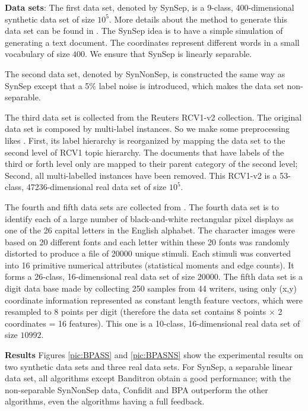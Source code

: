 \textbf{Data sets}:
The first data set, denoted by SynSep,  is a 9-class, 400-dimensional synthetic data set of size $10^5$. More details about the method to generate this data set can be found in \cite{kakade2008efficient}. The SynSep  idea is to have a simple simulation of generating a text document. The coordinates represent different words in a small vocabulary of size $400$. We ensure that SynSep is linearly separable. 

The second data set, denoted by SynNonSep, is constructed  the same way as  SynSep except that a 5\% label noise is introduced, which makes the data set non-separable. 

The third data set is collected from the Reuters RCV1-v2 collection\cite{David04RCV}. The original data set is composed by multi-label instances. So we make some preprocessing likes \cite{RB08a}. First, its label hierarchy is reorganized by mapping the data set to the second level of RCV1 topic hierarchy. The documents that have labels of the third or forth level only are mapped to their parent category of the second level; Second, all multi-labelled instances have been removed. This RCV1-v2 is a 53-class,  47236-dimensional real data set of size $10^5$. 

The fourth and fifth data sets are collected from \cite{letter26SC,number10SC}. The fourth data set is to identify each of a large number of black-and-white rectangular pixel displays as one of the 26 capital letters in the English alphabet. The character images were based on 20 different fonts and each letter within these 20 fonts was randomly distorted to produce a file of 20000 unique stimuli. Each stimuli was converted into 16 primitive numerical attributes (statistical moments and edge counts). It forms a 26-class, 16-dimensional real data set of size $20000$. The fifth data set is a digit data base made by collecting 250 samples from 44 writers, using only (x,y) coordinate information represented as constant length feature vectors, which were resampled to 8 points per digit (therefore the data set contains 8 points $\times$ 2 coordinates = 16 features). This one is a 10-class, 16-dimensional real data set of size $10992$.

\textbf{Results}
Figures \ref{pic:BPASS} and \ref{pic:BPASNS} show the experimental results on two synthetic data sets and three real data sets. For SynSep, a separable linear data set, all algorithms except Banditron obtain a good performance; with the non-separable SynNonSep data, Confidit and BPA outperform the other algorithms, even the algorithms having a full feedback.

